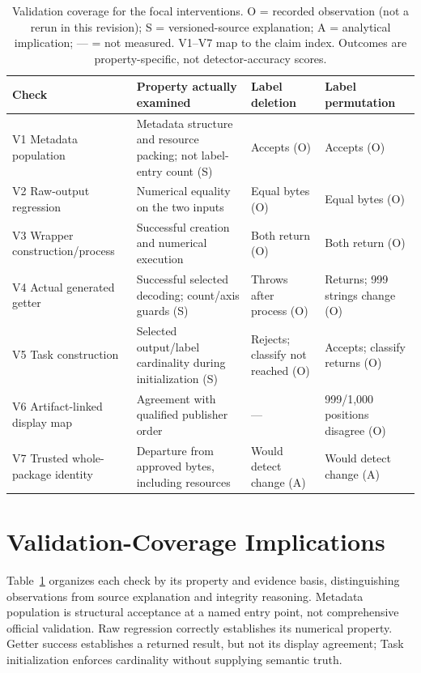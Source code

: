 \documentclass[10pt,conference]{IEEEtran}
\begin{document}
\begin{table}[t]
\caption{Validation coverage for the focal interventions. O = recorded observation (not a rerun in this revision); S = versioned-source explanation; A = analytical implication; --- = not measured. V1--V7 map to the claim index. Outcomes are property-specific, not detector-accuracy scores.}
\label{tab:coverage}
\centering\small
\begin{tabularx}{\textwidth}{@{}p{}p{}XX@{}}
\toprule
Check & Property actually examined & Label deletion & Label permutation\\
\midrule
V1 Metadata population & Metadata structure and resource packing; not label-entry count (S) & Accepts (O) & Accepts (O)\\
V2 Raw-output regression & Numerical equality on the two inputs & Equal bytes (O) & Equal bytes (O)\\
V3 Wrapper construction/process & Successful creation and numerical execution & Both return (O) & Both return (O)\\
V4 Actual generated getter & Successful selected decoding; count/axis guards (S) & Throws after process (O) & Returns; 999 strings change (O)\\
V5 Task construction & Selected output/label cardinality during initialization (S) & Rejects; classify not reached (O) & Accepts; classify returns (O)\\
V6 Artifact-linked display map & Agreement with qualified publisher order & --- & 999/1,000 positions disagree (O)\\
V7 Trusted whole-package identity & Departure from approved bytes, including resources & Would detect change (A) & Would detect change (A)\\
\bottomrule
\end{tabularx}
\end{table}

\section{Validation-Coverage Implications}
\label{sec:discussion}
Table~\ref{tab:coverage} organizes each check by its property and evidence basis, distinguishing observations from source explanation and integrity reasoning. Metadata population is structural acceptance at a named entry point, not comprehensive official validation. Raw regression correctly establishes its numerical property. Getter success establishes a returned result, but not its display agreement; Task initialization enforces cardinality without supplying semantic truth.
\end{document}
